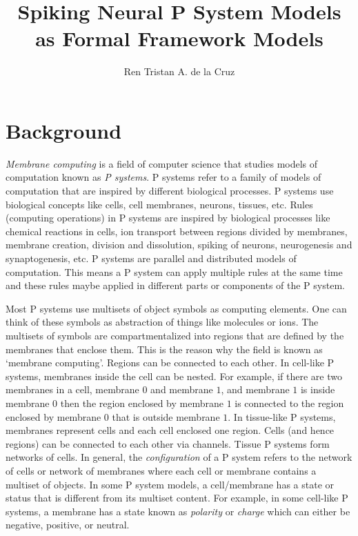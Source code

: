 \documentclass[a4paper]{article}
\theoremstyle{definition}
\begin{document}
\title
{
   Spiking Neural P System Models\\ as Formal Framework Models
}


\author
{
   Ren Tristan A. de la Cruz
}



\maketitle


\section{Background}\label{sec-background}

\emph{Membrane computing} is a field of computer science that studies models of computation known as
\emph{P systems}. P systems refer to a family of models of computation that are inspired by 
different biological processes. P systems use biological concepts like cells, cell membranes, 
neurons, tissues, etc. Rules (computing operations) in P systems are inspired by biological 
processes like chemical reactions in cells, ion transport between regions divided by membranes, 
membrane creation, division and dissolution, spiking of neurons, neurogenesis and synaptogenesis, 
etc. P systems are parallel and distributed models of computation. This means a P system can apply 
multiple rules at the same time and these rules maybe applied in different parts or components of
the P
system. 

Most P systems use multisets of object symbols as computing elements. One can think of these symbols
as abstraction of things like molecules or ions. The multisets of symbols are compartmentalized into
regions that are defined by the membranes that enclose them. This is the reason why the field is 
known as `membrane computing'. Regions can be connected to each other. In cell-like P systems, 
membranes inside the cell can be nested. For example, if there are two membranes in a cell, membrane
$0$ and membrane $1$, and membrane $1$ is inside membrane $0$ then the region enclosed by membrane 
$1$ is connected to the region enclosed by membrane $0$ that is outside membrane $1$. In tissue-like 
P systems, membranes represent cells and each cell enclosed one region. Cells (and hence regions) 
can be connected to each other via channels. Tissue P systems form networks of cells. In general, 
the \emph{configuration} of a P system refers to the network of cells or network of membranes where 
each cell or membrane contains a multiset of objects. In some P system models, a cell/membrane has a
state or status that is different from its multiset content. For example, in some cell-like P 
systems, a membrane has a state known as \emph{polarity} or \emph{charge} which can either be 
negative, positive, or neutral.
\end{document}
